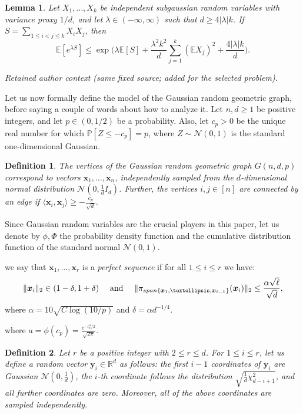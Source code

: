 \documentclass[10pt,a4paper]{amsart}
\newtheorem{lemma}{Lemma}
\def\Pb{\mathbb{P}}
\def\bE{\mathbb{E}}
\def\by{\boldsymbol{y}}
\def\cN{\mathcal{N}}
\newtheorem{definition}{Definition}
\def\bx{\boldsymbol{x}}
\def\bR{\mathbb{R}}
\begin{document}
\begin{lemma}\label{lemma:exponential_moment_special_case}
Let $X_1, \dots, X_k$ be independent subgaussian random variables with variance proxy $1/d$, and let $\lambda\in (-\infty, \infty)$ such that $d\geq 4|\lambda| k$. If $S=\sum_{1\leq i<j\leq k}X_iX_j$, then
{\smaller[0.3]
\[\bE[e^{\lambda S}]\leq \exp\bigg( \lambda \bE[S] + \frac{\lambda^2k^2}{d}\sum_{j=1}^k (\bE X_j)^2 +\frac{4|\lambda| k}{d}\bigg).\]
}
\end{lemma}

\par\medskip\noindent\textit{Retained author context (same fixed source; added for the selected problem).}\par
Let us now formally define the model of the Gaussian random geometric graph, before saying a couple of words about how to analyze it. Let $n, d\geq 1$ be positive integers, and let $p\in (0, 1/2)$ be a probability. Also, let $c_p>0$ be the unique real number for which $\Pb[Z\leq -c_p]=p$, where $Z\sim \cN(0, 1)$ is the standard one-dimensional Gaussian.

\begin{definition}\label{def:RGG}
The vertices of the Gaussian random geometric graph $G(n, d, p)$ correspond to vectors $\bx_1, \dots, \bx_n$, independently sampled from the $d$-dimensional normal distribution $\cN(0, \frac{1}{d}I_d)$. Further, the vertices $i, j\in [n]$ are connected by an edge if $\langle \bx_i, \bx_j\rangle\geq -\frac{c_p}{\sqrt{d}}$.
\end{definition}

Since Gaussian random variables are the crucial players in this paper, let us denote by $\phi, \Phi$ the probability density function and the cumulative distribution function of the standard normal $\cN(0, 1)$.

we say that $\bx_1, \dots, \bx_r$ is a \textit{perfect sequence} if for all $1\leq i\leq r$ we have:
{\smaller[0.3]
\[\|\bx_i\|_2\in (1-\delta, 1+\delta) \quad\text{ and }\quad \|\pi_{{\rm span} \{\bx_1, \dots, \bx_{i-1}\}} (\bx_i)\|_2\leq \frac{\alpha\sqrt{\ell}}{\sqrt{d}},\]
}
where $\alpha=10\sqrt{C\log(10/p)}$ and $\delta=\alpha d^{-1/4}$.

where $a=\phi(c_p)=\frac{e^{-c_p^2/2}}{\sqrt{2\pi}}$.

\begin{definition}
Let $r$ be a positive integer with $2\leq r\leq d$. For $1\leq i\leq r$, let us define a random vector $\by_i\in \bR^d$ as follows: the first $i-1$ coordinates of $\by_i$ are Gaussian $\cN(0, \frac{1}{d})$, the $i$-th coordinate follows the distribution $\sqrt{\frac{1}{d}\chi_{d-i+1}^2}$, and all further coordinates are zero. Moreover, all of the above coordinates are sampled independently.
\end{definition}
\end{document}

